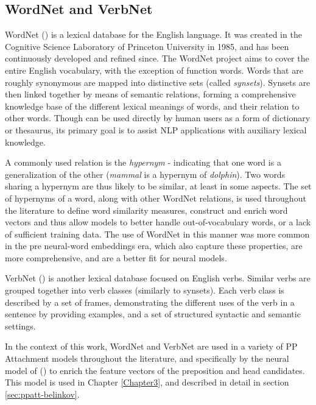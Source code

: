 \subsection{WordNet and VerbNet} \label{sec:wordnet}

WordNet (\cite{wordnet}) is a lexical database for the English language. It was created in the Cognitive Science Laboratory of Princeton University in 1985, and has been continuously developed and refined since. The WordNet project aims to cover the entire English vocabulary, with the exception of function words.  Words that are roughly synonymous are mapped into distinctive sets (called \emph{synsets}). Synsets are then linked together by means of semantic relations, forming a comprehensive knowledge base of the different lexical meanings of words, and their relation to other words. Though can be used directly by human users as a form of dictionary or thesaurus, its primary goal is to assist NLP applications with auxiliary lexical knowledge. 

A commonly used relation is the \emph{hypernym} - indicating that one word is a generalization of the other (\emph{mammal} is a hypernym of \emph{dolphin}). Two words sharing a hypernym are thus likely to be similar, at least in some aspects. The set of hypernyms of a word, along with other WordNet relations, is used throughout the literature to define word similarity measures, construct and enrich word vectors and thus allow models to better handle out-of-vocabulary words, or a lack of sufficient training data. The use of WordNet in this manner was more common in the pre neural-word embeddings era, which also capture these properties, are more comprehensive, and are a better fit for neural models.

VerbNet (\cite{Schuler:05:VBC:1104493}) is another lexical database focused on English verbs. Similar verbs are grouped together into verb classes (similarly to synsets). Each verb class is described by a set  of frames, demonstrating the different uses of the verb in a sentence by providing examples, and a set of structured syntactic and semantic settings. 

In the context of this work, WordNet and VerbNet are used in a variety of PP Attachment models throughout the literature, and specifically by the neural model of (\cite{hpcd}) to enrich the feature vectors of the preposition and head candidates. This model is used in Chapter \ref{Chapter3}, and described in detail in section \ref{sec:ppatt-belinkov}.

\pagebreak